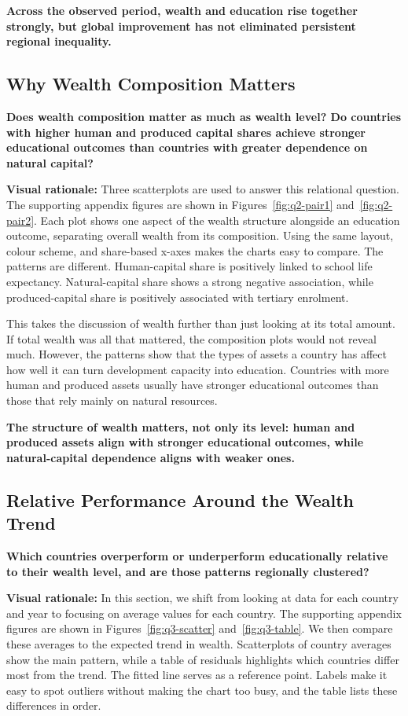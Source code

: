 \documentclass{vgtc}
\begin{document}
\textbf{Across the observed period, wealth and education rise together strongly, but global improvement has not eliminated persistent regional inequality.}

\subsection{Why Wealth Composition Matters}
\textbf{Does wealth composition matter as much as wealth level? Do countries with higher human and produced capital shares achieve stronger educational outcomes than countries with greater dependence on natural capital?}

\textbf{Visual rationale:} Three scatterplots are used to answer this relational question. The supporting appendix figures are shown in Figures~\ref{fig:q2-pair1} and~\ref{fig:q2-pair2}. Each plot shows one aspect of the wealth structure alongside an education outcome, separating overall wealth from its composition. Using the same layout, colour scheme, and share-based x-axes makes the charts easy to compare. The patterns are different. Human-capital share is positively linked to school life expectancy. Natural-capital share shows a strong negative association, while produced-capital share is positively associated with tertiary enrolment.

This takes the discussion of wealth further than just looking at its total amount. If total wealth was all that mattered, the composition plots would not reveal much. However, the patterns show that the types of assets a country has affect how well it can turn development capacity into education. Countries with more human and produced assets usually have stronger educational outcomes than those that rely mainly on natural resources.

\textbf{The structure of wealth matters, not only its level: human and produced assets align with stronger educational outcomes, while natural-capital dependence aligns with weaker ones.}

\subsection{Relative Performance Around the Wealth Trend}
\textbf{Which countries overperform or underperform educationally relative to their wealth level, and are those patterns regionally clustered?}

\textbf{Visual rationale:} In this section, we shift from looking at data for each country and year to focusing on average values for each country. The supporting appendix figures are shown in Figures~\ref{fig:q3-scatter} and~\ref{fig:q3-table}. We then compare these averages to the expected trend in wealth. Scatterplots of country averages show the main pattern, while a table of residuals highlights which countries differ most from the trend. The fitted line serves as a reference point. Labels make it easy to spot outliers without making the chart too busy, and the table lists these differences in order.
\end{document}
